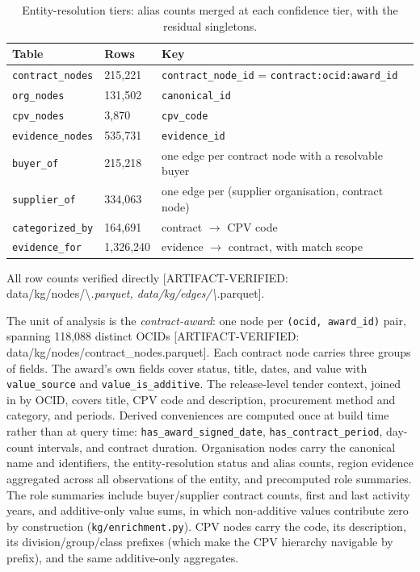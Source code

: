 \documentclass[10pt]{article} %
\begin{document}
\begin{table}[t]
\centering
\small
\caption{Entity-resolution tiers: alias counts merged at each confidence tier, with the residual singletons.}
\label{tab:03_data_kg_1}
\begin{tabular}{lll}
\toprule
Table & Rows & Key \\
\midrule
\texttt{contract\_nodes} & 215,221 & \texttt{contract\_node\_id} = \texttt{contract:{ocid}:{award\_id}} \\
\texttt{org\_nodes} & 131,502 & \texttt{canonical\_id} \\
\texttt{cpv\_nodes} & 3,870 & \texttt{cpv\_code} \\
\texttt{evidence\_nodes} & 535,731 & \texttt{evidence\_id} \\
\texttt{buyer\_of} & 215,218 & one edge per contract node with a resolvable buyer \\
\texttt{supplier\_of} & 334,063 & one edge per (supplier organisation, contract node) \\
\texttt{categorized\_by} & 164,691 & contract $\rightarrow$ CPV code \\
\texttt{evidence\_for} & 1,326,240 & evidence $\rightarrow$ contract, with match scope \\
\bottomrule
\end{tabular}
\end{table}


All row counts verified directly [ARTIFACT-VERIFIED: data/kg/nodes/\textbackslash{}\emph{.parquet, data/kg/edges/\textbackslash{}}.parquet].

The unit of analysis is the \emph{contract-award}: one node per \texttt{(ocid, award\_id)} pair, spanning 118,088 distinct OCIDs [ARTIFACT-VERIFIED: data/kg/nodes/contract\_nodes.parquet]. Each contract node carries three groups of fields. The award's own fields cover status, title, dates, and value with \texttt{value\_source} and \texttt{value\_is\_additive}. The release-level tender context, joined in by OCID, covers title, CPV code and description, procurement method and category, and periods. Derived conveniences are computed once at build time rather than at query time: \texttt{has\_award\_signed\_date}, \texttt{has\_contract\_period}, day-count intervals, and contract duration. Organisation nodes carry the canonical name and identifiers, the entity-resolution status and alias counts, region evidence aggregated across all observations of the entity, and precomputed role summaries. The role summaries include buyer/supplier contract counts, first and last activity years, and additive-only value sums, in which non-additive values contribute zero by construction (\texttt{kg/enrichment.py}). CPV nodes carry the code, its description, its division/group/class prefixes (which make the CPV hierarchy navigable by prefix), and the same additive-only aggregates.
\end{document}
